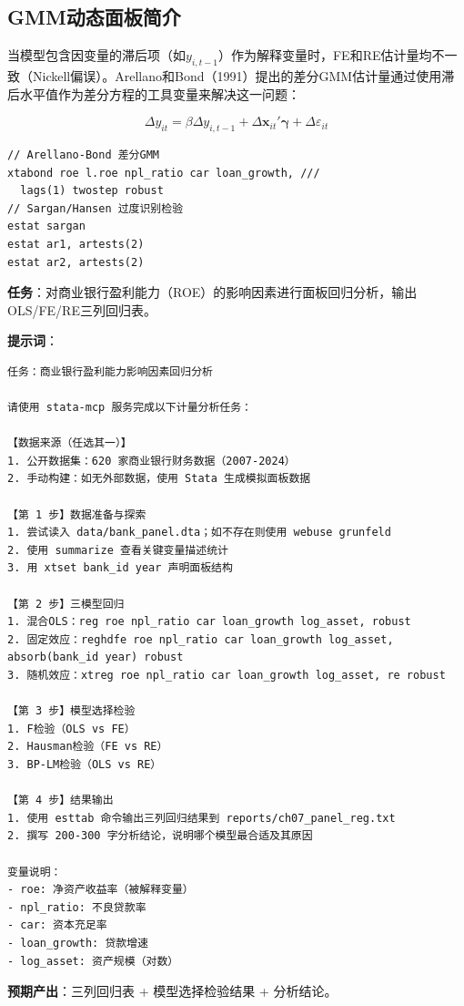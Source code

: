 \subsection{GMM动态面板简介}

当模型包含因变量的滞后项（如$y_{i,t-1}$）作为解释变量时，FE和RE估计量均不一致（Nickell偏误）。Arellano和Bond（1991）提出的差分GMM估计量通过使用滞后水平值作为差分方程的工具变量来解决这一问题：

\[
\Delta y_{it} = \beta \Delta y_{i,t-1} + \Delta \mathbf{x}_{it}'\boldsymbol{\gamma} + \Delta \varepsilon_{it}
\]

\begin{lstlisting}[style=stata]
// Arellano-Bond 差分GMM
xtabond roe l.roe npl_ratio car loan_growth, ///
  lags(1) twostep robust
// Sargan/Hansen 过度识别检验
estat sargan
estat ar1, artests(2)
estat ar2, artests(2)
\end{lstlisting}

\begin{practicebox}
\textbf{任务}：对商业银行盈利能力（ROE）的影响因素进行面板回归分析，输出OLS/FE/RE三列回归表。

\textbf{提示词}：

\begin{lstlisting}
任务：商业银行盈利能力影响因素回归分析

请使用 stata-mcp 服务完成以下计量分析任务：

【数据来源（任选其一）】
1. 公开数据集：620 家商业银行财务数据（2007-2024）
2. 手动构建：如无外部数据，使用 Stata 生成模拟面板数据

【第 1 步】数据准备与探索
1. 尝试读入 data/bank_panel.dta；如不存在则使用 webuse grunfeld
2. 使用 summarize 查看关键变量描述统计
3. 用 xtset bank_id year 声明面板结构

【第 2 步】三模型回归
1. 混合OLS：reg roe npl_ratio car loan_growth log_asset, robust
2. 固定效应：reghdfe roe npl_ratio car loan_growth log_asset, absorb(bank_id year) robust
3. 随机效应：xtreg roe npl_ratio car loan_growth log_asset, re robust

【第 3 步】模型选择检验
1. F检验（OLS vs FE）
2. Hausman检验（FE vs RE）
3. BP-LM检验（OLS vs RE）

【第 4 步】结果输出
1. 使用 esttab 命令输出三列回归结果到 reports/ch07_panel_reg.txt
2. 撰写 200-300 字分析结论，说明哪个模型最合适及其原因

变量说明：
- roe: 净资产收益率（被解释变量）
- npl_ratio: 不良贷款率
- car: 资本充足率
- loan_growth: 贷款增速
- log_asset: 资产规模（对数）
\end{lstlisting}

\textbf{预期产出}：三列回归表 + 模型选择检验结果 + 分析结论。
\end{practicebox}

